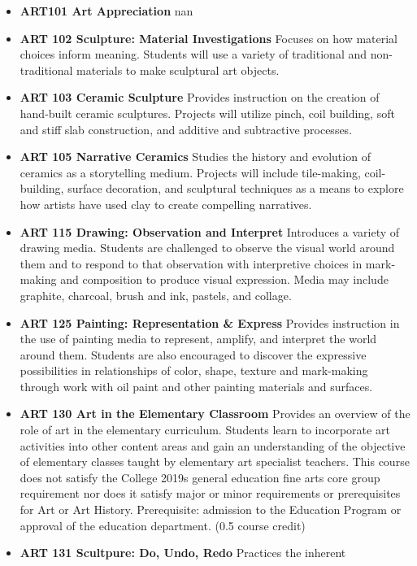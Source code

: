 \documentclass[
  letterpaper,
]{scrbook}
\providecommand{\tightlist}{%
  \setlength{\itemsep}{0pt}\setlength{\parskip}{0pt}}
\begin{document}
\begin{itemize}
\tightlist
\item
  \textbf{ART101 Art Appreciation} nan
\item
  \textbf{ART 102 Sculpture: Material Investigations} Focuses on how
  material choices inform meaning. Students will use a variety of
  traditional and non-traditional materials to make sculptural art
  objects.
\item
  \textbf{ART 103 Ceramic Sculpture} Provides instruction on the
  creation of hand-built ceramic sculptures. Projects will utilize
  pinch, coil building, soft and stiff slab construction, and additive
  and subtractive processes.
\item
  \textbf{ART 105 Narrative Ceramics} Studies the history and evolution
  of ceramics as a storytelling medium. Projects will include
  tile-making, coil-building, surface decoration, and sculptural
  techniques as a means to explore how artists have used clay to create
  compelling narratives.
\item
  \textbf{ART 115 Drawing: Observation and Interpret} Introduces a
  variety of drawing media. Students are challenged to observe the
  visual world around them and to respond to that observation with
  interpretive choices in mark-making and composition to produce visual
  expression. Media may include graphite, charcoal, brush and ink,
  pastels, and collage.
\item
  \textbf{ART 125 Painting: Representation \& Express} Provides
  instruction in the use of painting media to represent, amplify, and
  interpret the world around them. Students are also encouraged to
  discover the expressive possibilities in relationships of color,
  shape, texture and mark-making through work with oil paint and other
  painting materials and surfaces.
\item
  \textbf{ART 130 Art in the Elementary Classroom} Provides an overview
  of the role of art in the elementary curriculum. Students learn to
  incorporate art activities into other content areas and gain an
  understanding of the objective of elementary classes taught by
  elementary art specialist teachers. This course does not satisfy the
  College 2019s general education fine arts core group requirement nor
  does it satisfy major or minor requirements or prerequisites for Art
  or Art History. Prerequisite: admission to the Education Program or
  approval of the education department. (0.5 course credit)
\item
  \textbf{ART 131 Scultpure: Do, Undo, Redo} Practices the inherent

\end{itemize}
\end{document}
